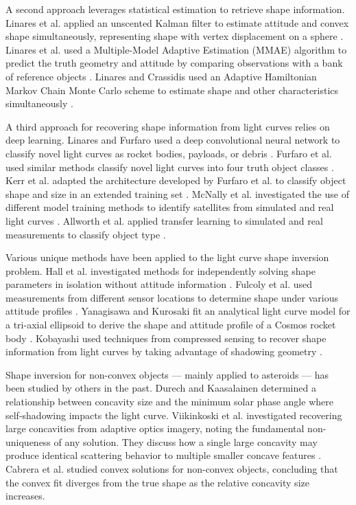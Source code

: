 A second approach leverages statistical estimation to retrieve shape information. Linares et al. applied an unscented Kalman filter to estimate attitude and convex shape simultaneously, representing shape with vertex displacement on a sphere \cite{linares2012}. Linares et al. used a Multiple-Model Adaptive Estimation (MMAE) algorithm to predict the truth geometry and attitude by comparing observations with a bank of reference objects \cite{linares2014space}. Linares and Crassidis used an Adaptive Hamiltonian Markov Chain Monte Carlo scheme to estimate shape and other characteristics simultaneously \cite{linares2018space}.

A third approach for recovering shape information from light curves relies on deep learning. Linares and Furfaro used a deep convolutional neural network to classify novel light curves as rocket bodies, payloads, or debris \cite{linares2016}. Furfaro et al. used similar methods classify novel light curves into four truth object classes \cite{furfaro2019}. Kerr et al. adapted the architecture developed by Furfaro et al. to classify object shape and size in an extended training set \cite{kerr2021}. McNally et al. investigated the use of different model training methods to identify satellites from simulated and real light curves \cite{mcnally2021}. Allworth et al. applied transfer learning to simulated and real measurements to classify object type \cite{allworth2021}.

Various unique methods have been applied to the light curve shape inversion problem. Hall et al. investigated methods for independently solving shape parameters in isolation without attitude information \cite{hall2007}. Fulcoly et al. used measurements from different sensor locations to determine shape under various attitude profiles \cite{fulcoly2012}. Yanagisawa and Kurosaki fit an analytical light curve model for a tri-axial ellipsoid to derive the shape and attitude profile of a Cosmos rocket body  \cite{yanagisawa2012}. Kobayashi used techniques from compressed sensing to recover shape information from light curves by taking advantage of shadowing geometry \cite{kobayashi2020,kobayashi2021}.

Shape inversion for non-convex objects --- mainly applied to asteroids --- has been studied by others in the past. Durech and Kaasalainen \cite{durech2003} determined a relationship between concavity size and the minimum solar phase angle where self-shadowing impacts the light curve. Viikinkoski et al. \cite{viikinkoski2017} investigated recovering large concavities from adaptive optics imagery, noting the fundamental non-uniqueness of any solution. They discuss how a single large concavity may produce identical scattering behavior to multiple smaller concave features \cite{viikinkoski2017}. Cabrera et al. \cite{cabrera2021} studied convex solutions for non-convex objects, concluding that the convex fit diverges from the true shape as the relative concavity size increases. 

